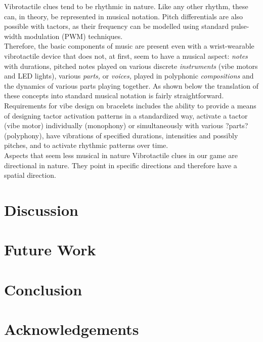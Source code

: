 \documentclass[a4paper, twocolumn]{article}
\begin{document}
Vibrotactile clues tend to be rhythmic in nature. Like any other rhythm, these can, in theory, be represented in musical notation. Pitch differentials are also possible with tactors, as their frequency can be modelled using standard pulse-width modulation (PWM) techniques.\\

Therefore, the basic components of music are present even with a wrist-wearable vibrotactile device that does not, at first, seem to have a musical aspect: \textit{notes} with durations, pitched notes played on various discrete \textit{instruments} (vibe motors and LED lights), various \textit{parts,} or \textit{voices,} played in polyphonic \textit{compositions} and the dynamics of various parts playing together. As shown below the translation of these concepts into standard musical notation is fairly straightforward.\\

Requirements for vibe design on bracelets includes the ability to provide a means of designing tactor activation patterns in a standardized way, activate a tactor (vibe motor) individually (monophony) or simultaneously with various ?parts? (polyphony), have vibrations of specified durations, intensities and possibly pitches, and to activate rhythmic patterns over time.\\




Aspects that seem less musical in nature
Vibrotactile clues in our game are directional in nature. They point in specific directions and therefore have a spatial direction. 

\section{Discussion}
\section{Future Work}
\section{Conclusion}
\section{Acknowledgements}




  
\end{document}
